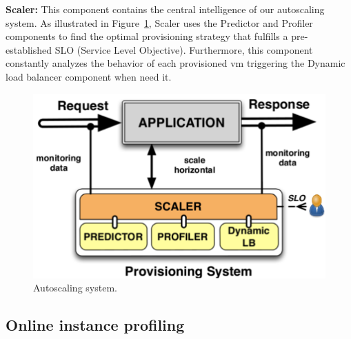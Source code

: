 \vspace{2mm}

\textbf{Scaler:} This component contains the central intelligence of our autoscaling system. As illustrated in Figure~\ref{autoScalingSys}, Scaler uses the Predictor and Profiler components to find the optimal provisioning strategy that fulfills a pre-established SLO (Service Level Objective). Furthermore, this component constantly analyzes the behavior of each provisioned vm triggering the Dynamic load balancer component when need it.

\begin{figure}[htb]
  \begin{center}
    \includegraphics[width=.85\linewidth]{images/monitoringSchema}
  \end{center}
\vspace{-5mm}
  \caption{Autoscaling system.}
  \label{autoScalingSys}
\end{figure}


\subsection{Online instance profiling\label{profiling}}

